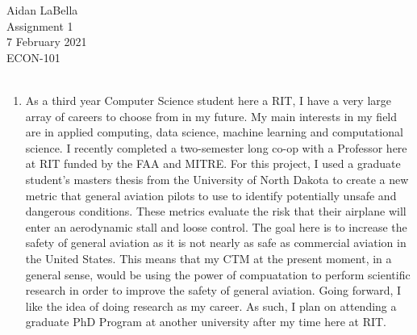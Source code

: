 \documentclass[12pt]{article}
\begin{document}
\noindent
Aidan LaBella \\
Assignment 1 \\ 
7 February 2021\\
ECON-101 \\
\\
\begin{enumerate}
\item
\indent
As a third year Computer Science student here a RIT, I have a very large array of careers to choose from in my future. My main interests in my field are in applied computing, data science, machine learning and computational science. I recently completed a two-semester long co-op with a Professor here at RIT funded by the FAA and MITRE. For this project, I used a graduate student's masters thesis from the University of North Dakota to create a new metric that general aviation pilots to use to identify potentially unsafe and dangerous conditions. These metrics evaluate the risk that their airplane will enter an aerodynamic stall and loose control. The goal here is to increase the safety of general aviation as it is not nearly as safe as commercial aviation in the United States. This means that my CTM at the present moment, in a general sense, would be using the power of compuatation to perform scientific research in order to improve the safety of general aviation. Going forward, I like the idea of doing research as my career. As such, I plan on attending a graduate PhD Program at another university after my time here at RIT. \\ 

\end{enumerate}
\end{document}
